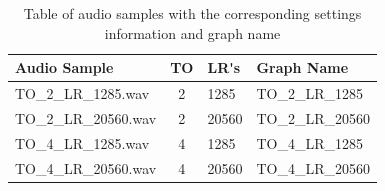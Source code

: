 \documentclass[../../main.tex]{subfiles}
\begin{document}
				\begin{table}
				\begin{center}
					\begin{tabular}{|l | c | l | l|}
					\hline
					\textbf{Audio Sample} & \textbf{\ac{TO}} & \textbf{\ac{LR's}} & \textbf{Graph Name}\\ \hline
					TO\_2\_LR\_1285.wav & 2 & 1285 & TO\_2\_LR\_1285 \\
					TO\_2\_LR\_20560.wav & 2 & 20560 & TO\_2\_LR\_20560 \\
					TO\_4\_LR\_1285.wav & 4 & 1285 & TO\_4\_LR\_1285\\
					TO\_4\_LR\_20560.wav & 4 & 20560 & TO\_4\_LR\_20560 \\ \hline
					\end{tabular}
				\end{center}
				\caption{Table of audio samples with the corresponding settings information and graph name}
				\label{odeonSettingsTable}
				\end{table}
\end{document}
